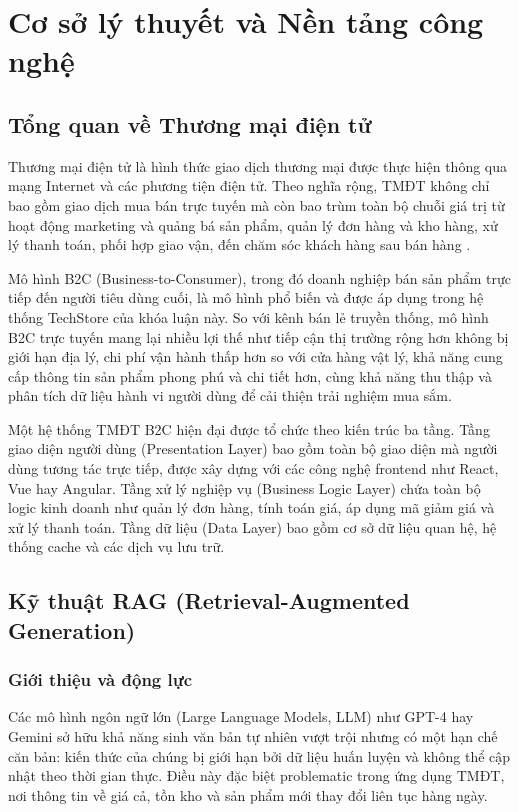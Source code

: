 \chapter{Cơ sở lý thuyết và Nền tảng công nghệ}

\section{Tổng quan về Thương mại điện tử}

Thương mại điện tử là hình thức giao dịch thương mại được thực hiện thông qua mạng Internet và các phương tiện điện tử. Theo nghĩa rộng, TMĐT không chỉ bao gồm giao dịch mua bán trực tuyến mà còn bao trùm toàn bộ chuỗi giá trị từ hoạt động marketing và quảng bá sản phẩm, quản lý đơn hàng và kho hàng, xử lý thanh toán, phối hợp giao vận, đến chăm sóc khách hàng sau bán hàng \cite{chaffey2019digital}.

Mô hình B2C (Business-to-Consumer), trong đó doanh nghiệp bán sản phẩm trực tiếp đến người tiêu dùng cuối, là mô hình phổ biến và được áp dụng trong hệ thống TechStore của khóa luận này. So với kênh bán lẻ truyền thống, mô hình B2C trực tuyến mang lại nhiều lợi thế như tiếp cận thị trường rộng hơn không bị giới hạn địa lý, chi phí vận hành thấp hơn so với cửa hàng vật lý, khả năng cung cấp thông tin sản phẩm phong phú và chi tiết hơn, cùng khả năng thu thập và phân tích dữ liệu hành vi người dùng để cải thiện trải nghiệm mua sắm.

Một hệ thống TMĐT B2C hiện đại được tổ chức theo kiến trúc ba tầng. Tầng giao diện người dùng (Presentation Layer) bao gồm toàn bộ giao diện mà người dùng tương tác trực tiếp, được xây dựng với các công nghệ frontend như React, Vue hay Angular. Tầng xử lý nghiệp vụ (Business Logic Layer) chứa toàn bộ logic kinh doanh như quản lý đơn hàng, tính toán giá, áp dụng mã giảm giá và xử lý thanh toán. Tầng dữ liệu (Data Layer) bao gồm cơ sở dữ liệu quan hệ, hệ thống cache và các dịch vụ lưu trữ.

\section{Kỹ thuật RAG (Retrieval-Augmented Generation)}

\subsection{Giới thiệu và động lực}

Các mô hình ngôn ngữ lớn (Large Language Models, LLM) như GPT-4 hay Gemini sở hữu khả năng sinh văn bản tự nhiên vượt trội nhưng có một hạn chế căn bản: kiến thức của chúng bị giới hạn bởi dữ liệu huấn luyện và không thể cập nhật theo thời gian thực. Điều này đặc biệt problematic trong ứng dụng TMĐT, nơi thông tin về giá cả, tồn kho và sản phẩm mới thay đổi liên tục hàng ngày.

